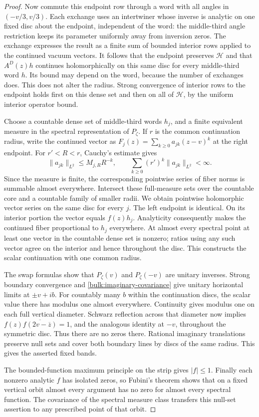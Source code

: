 \begin{proof}
Now commute this endpoint row through a word with all angles in
$(-v/3,v/3)$. Each exchange uses an intertwiner whose inverse is
analytic on one fixed disc about the endpoint, independent of the
word: the middle-third angle restriction keeps its parameter
uniformly away from inversion zeros. The exchange expresses the
result as a finite sum of bounded interior rows applied to the
continued vacuum vectors. It follows that the endpoint preserves
$\mathcal H$ and that $A^D(z)h$ continues holomorphically on this
same disc for every middle-third word $h$. Its bound may depend
on the word, because the number of exchanges does. This does not
alter the radius. Strong convergence of interior rows to the
endpoint holds first on this dense set and then on all of
$\mathcal H$, by the uniform interior operator bound.

Choose a countable dense set of middle-third words $h_j$, and a
finite equivalent measure in the spectral representation of
$P_\zeta$. If $r$ is the common continuation radius, write the
continued vector as $F_j(z)=\sum_{k\ge0}a_{jk}(z-v)^k$ at the
right endpoint. For $r'<R<r$, Cauchy's estimate gives
\[
 \|a_{jk}\|_{L^2}\le M_{j,R}R^{-k},\qquad
 \sum_{k\ge0}(r')^k\|a_{jk}\|_{L^2}<\infty.
\]
Since the measure is finite, the corresponding pointwise series
of fiber norms is summable almost everywhere. Intersect these
full-measure sets over the countable core and a countable family
of smaller radii. We obtain pointwise holomorphic vector series
on the same disc for every $j$. The left endpoint is identical.
On its interior portion the vector equals $f(z)h_j$.
Analyticity consequently makes the continued fiber proportional
to $h_j$ everywhere. At almost every spectral point at least one
vector in the countable dense set is nonzero; ratios using any
such vector agree on the interior and hence throughout the disc.
This constructs the scalar continuation with one common radius.

The swap formulas show that $P_\zeta(v)$ and $P_\zeta(-v)$ are
unitary inverses. Strong boundary convergence and
\eqref{bulk:imaginary-covariance} give unitary horizontal limits
at $\pm v+ib$. For countably many $b$ within the continuation
discs, the scalar value there has modulus one almost everywhere.
Continuity gives modulus one on each full vertical diameter.
Schwarz reflection across that diameter now implies
$f(z)\overline{f(2v-\overline z)}=1$, and the analogous identity
at $-v$, throughout the symmetric disc. Thus there are no zeros
there. Rational imaginary translations preserve null sets and
cover both boundary lines by discs of the same radius. This gives
the asserted fixed bands.

The bounded-function maximum principle on the strip gives
$|f|\le1$. Finally each nonzero analytic $f$ has isolated zeros,
so Fubini's theorem shows that on a fixed vertical orbit almost
every argument has no zero for almost every spectral function.
The covariance of the spectral measure class transfers this
null-set assertion to any prescribed point of that orbit.
\end{proof}

